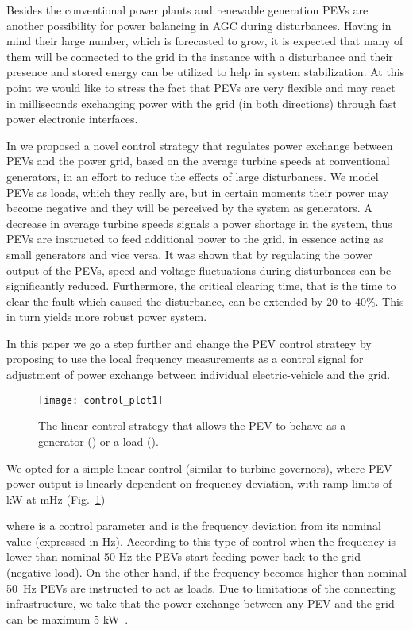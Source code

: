 \documentclass[final,12pt]{elsarticle}
\begin{document}
Besides the conventional power plants and renewable generation PEVs are another
possibility for power balancing in AGC during disturbances. Having
in mind their large number, which is forecasted to grow, it is expected that many
of them will be connected to the grid in the instance with a disturbance and
their presence and stored energy can be utilized to help in system
stabilization. At this point we would like to stress the fact that PEVs are very
flexible and may react in milliseconds exchanging power with the grid (in both
directions) through fast power electronic interfaces.

In \cite{gajduk2014improving} we proposed a novel control strategy that regulates power
exchange between PEVs and the power grid, based on the average turbine speeds at
conventional generators, in an effort to reduce the effects of large
disturbances. We model PEVs as loads, which they really are, but in certain
moments their power may become negative and they will be perceived by the system
as generators. A decrease in average turbine speeds signals a power shortage in
the system, thus PEVs are instructed to feed additional power to the grid, in
essence acting as small generators and vice versa. It was shown that by
regulating the power output of the PEVs, speed and voltage fluctuations during
disturbances can be significantly reduced. Furthermore, the critical clearing
time, that is the time to clear the fault which caused the disturbance, can be
extended by 20 to 40\%. This in turn yields more robust power system.

In this paper we go a step further and change the PEV control strategy by
proposing to use the local frequency measurements as a control signal for
adjustment of power exchange between individual electric-vehicle and the grid.

\begin{figure}[!htb]
\centering
\texttt{[image: control\_plot1]}
\caption{The linear control strategy that
allows the PEV to behave as a generator () or a load ().}
\label{fig:control_plot}
\end{figure}

We opted for a simple linear control (similar to turbine governors), where PEV
power output is linearly dependent on frequency deviation, with ramp limits of
 kW at  mHz (Fig.~\ref{fig:control_plot})

where  is a control parameter and  is the
frequency deviation from its nominal value (expressed in Hz).
According to this type of control when the frequency is lower than nominal 50 Hz
the PEVs start feeding power back to the grid (negative load). On the other
hand, if the frequency becomes higher than nominal 50~Hz 
PEVs are instructed to act as loads. Due to limitations of the connecting infrastructure, we take that the power exchange between any PEV and the grid can be maximum 5
kW~\cite{kempton2005vehicle1}.
\end{document}
